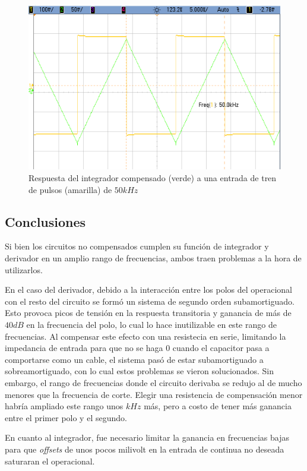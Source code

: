 \documentclass[../../main.tex]{subfiles}
\begin{document}
\begin{figure}  [H]
	\centering
	\label{fig:i-1k}
	\includegraphics[scale=0.4]{fotos/tc_tp2_ej4_icomp_50k.png}
	\caption{Respuesta del integrador compensado (verde) a una entrada de tren de pulsos (amarilla) de $50kHz$}
\end{figure}




\subsection{Conclusiones}
Si bien los circuitos no compensados cumplen su funci\'on de integrador y derivador en un amplio rango de frecuencias, ambos traen problemas a la hora de utilizarlos.\par

En el caso del derivador, debido a la interacci\'on entre los polos del operacional con el resto del circuito se form\'o un sistema de segundo orden subamortiguado. Esto provoca picos de tensi\'on en la respuesta transitoria y ganancia de m\'as de $40dB$ en la frecuencia del polo, lo cual lo hace inutilizable en este rango de frecuencias. Al compensar este efecto con una resistecia en serie, limitando la impedancia de entrada para que no se haga 0 cuando el capacitor pasa a comportarse como un cable, el sistema pas\'o de estar subamortiguado a sobreamortiguado, con lo cual estos problemas se vieron solucionados. Sin embargo, el rango de frecuencias donde el circuito derivaba se redujo al de mucho menores que la frecuencia de corte. Elegir una resistencia de compensaci\'on menor habr\'ia ampliado este rango unos $kHz$ m\'as, pero a costo de tener m\'as ganancia entre el primer polo y el segundo.\par

En cuanto al integrador, fue necesario limitar la ganancia en frecuencias bajas para que \textit{offsets} de unos pocos milivolt en la entrada de continua no deseada saturaran el operacional. 
\end{document}
